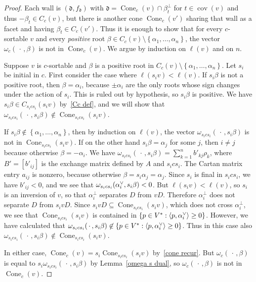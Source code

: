 \documentclass[ALCO,ThmDefs,Unicode,epreuves]{cedram}
\DeclareMathOperator{\cov}{cov}
\DeclareMathOperator{\Cone}{Cone}
\newcommand{\set}[1]{{\left\lbrace #1 \right\rbrace}}
\newcommand{\br}[1]{{\langle #1 \rangle}}
\newcommand{\ck}{\spcheck}
\renewcommand{\d}{{\mathfrak d}}
\begin{document}
\begin{proof}
Each wall is $(\d,f_\d)$ with $\d=\Cone_c(v)\cap\beta_t^\perp$ for $t\in\cov(v)$ and thus $-\beta_t\in C_c(v)$, but there is another cone $\Cone_c(v')$ sharing that wall as a facet and having $\beta_t\in C_c(v')$.
Thus it is enough to show that for every $c$-sortable $v$ and every \emph{positive} root $\beta\in C_c(v)\setminus\set{\alpha_1,\ldots,\alpha_n}$, the vector $\omega_c(\,\cdot\,,\beta)$ is not in $\Cone_c(v)$.
We argue by induction on $\ell(v)$ and on $n$.

Suppose $v$ is $c$-sortable and $\beta$ is a positive root in $C_c(v)\setminus\set{\alpha_1,\ldots,\alpha_n}$.
Let $s_i$ be initial in $c$.
First consider the case where $\ell(s_iv)<\ell(v)$.
If $s_i\beta$ is not a positive root, then $\beta=\alpha_i$, because $\pm\alpha_i$ are the only roots whose sign changes under the action of $s_i$.
This is ruled out by hypothesis, so $s_i\beta$ is positive.
We have $s_i\beta\in C_{s_ics_i}(s_iv)$ by~\eqref{Cc def}, and we will show that $\omega_{s_ics_i}(\,\cdot\,,s_i\beta)\not\in\Cone_{s_ics_i}(s_iv)$.

If $s_i\beta\not\in\set{\alpha_1,\ldots,\alpha_n}$, then by induction on $\ell(v)$, the vector $\omega_{s_ics_i}(\,\cdot\,,s_i\beta)$ is not in $\Cone_{s_ics_i}(s_iv)$.
If on the other hand $s_i\beta=\alpha_j$ for some $j$, then $i\neq j$ because otherwise $\beta=-\alpha_i$.
We have $\omega_{s_ics_i}(\,\cdot\,,s_i\beta)=\sum_{k=1}^nb'_{kj}\rho_k$, where $B'=[b'_{ij}]$ is the exchange matrix defined by $A$ and $s_ics_i$.
The Cartan matrix entry $a_{ij}$ is nonzero, because otherwise $\beta=s_i\alpha_j=\alpha_j$.
Since $s_i$ is final in $s_ics_i$, we have $b'_{ij}<0$, and we see that $\omega_{s_ics_i}(\alpha_i\ck,s_i\beta)<0$.
But $\ell(s_iv)<\ell(v)$, so $s_i$ is an inversion of $v$, so that $\alpha_i^\perp$ separates $D$ from $vD$.
Therefore $\alpha_i^\perp$ does not separate $D$ from $s_ivD$.
Since $s_ivD\subseteq\Cone_{s_ics_i}(s_iv)$, which does not cross $\alpha_i^\perp$, we see that $\Cone_{s_ics_i}(s_iv)$ is contained in $\set{p\in V^*:\br{p,\alpha_i\ck}\ge0}$.
However, we have calculated that $\omega_{s_ics_i}(\,\cdot\,,s_i\beta)\not\in\set{p\in V^*:\br{p,\alpha_i\ck}\ge0}$.
Thus in this case also $\omega_{s_ics_i}(\,\cdot\,,s_i\beta)\not\in\Cone_{s_ics_i}(s_iv)$.

In either case, $\Cone_c(v)=s_i\Cone_{s_ics_i}(s_iv)$ by~\eqref{cone recur}.
But $\omega_c(\,\cdot\,,\beta)$ is equal to $s_i\omega_{s_ics_i}(\,\cdot\,,s_i\beta)$ by Lemma~\ref{omega s dual}, so $\omega_c(\,\cdot\,,\beta)$ is not in $\Cone_c(v)$.


\end{proof}
\end{document}
